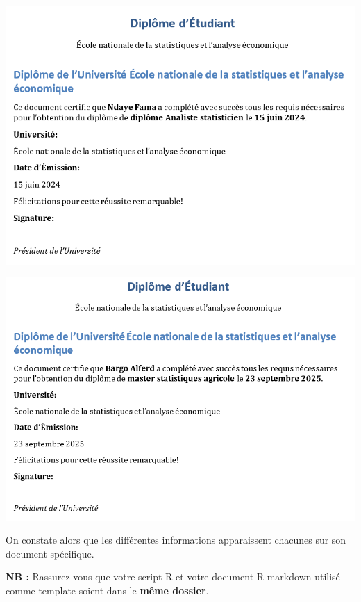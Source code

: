 \documentclass[
  12pt,
]{article}
\begin{document}
\begin{center}\includegraphics[width=1\linewidth,height=1\textheight]{../Document_Rmarkdown/Images/Sortie_param2} \end{center}

\begin{center}\includegraphics[width=1\linewidth,height=1\textheight]{../Document_Rmarkdown/Images/Sortie_param3} \end{center}

On constate alors que les différentes informations apparaissent chacunes
sur son document spécifique.

\textbf{NB :} Rassurez-vous que votre script R et votre document R
markdown utilisé comme template soient dans le \textbf{même dossier}.
\end{document}
